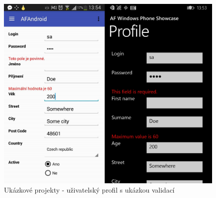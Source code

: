 \begin{figure}
\includegraphics[width=\linewidth]{figures/screenshots/ProfileValidations}
\caption{Ukázkové projekty - uživatelský profil s ukázkou validací}
\label{img:profileValidations}
\end{figure}	